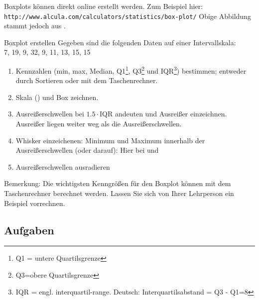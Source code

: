 
Boxplots können direkt online erstellt werden. Zum Beispiel hier:\\
\texttt{http://www.alcula.com/calculators/statistics/box-plot/}
Obige Abbildung stammt jedoch aus \cite{frommenwiler17alg}.

\begin{beispiel}{Boxplot erstellen}{}
  Gegeben sind die folgenden Daten auf einer Intervallskala:\\
  7, 19, 9, 32, 9, 11, 13, 15, 15
\end{beispiel}

\begin{rezept}{}{}
  \begin{enumerate}
  \item Kennzahlen (min, max, Median, Q1\footnote{Q1 = untere Quartilsgrenze}, Q3\footnote{Q3=obere Quartilsgrenze} und IQR\footnote{IQR = engl. interquartil-range. Deutsch: Interquartilsabstand = Q3 - Q1=8}) bestimmen; entweder durch Sortieren oder mit dem Taschenrechner.
  \item Skala () und Box zeichnen.
  \item
    Ausreißerschwellen bei $1.5\cdot$IQR andeuten und Ausreißer einzeichnen. Ausreißer liegen weiter weg als die Ausreißerschwellen.
  \item Whisker einzeichenen: Minimum und Maximum innerhalb der Ausreißerschwellen (oder darauf): Hier bei  und 
  \item Ausreißerschwellen ausradieren
    \end{enumerate}
\end{rezept}

Bemerkung: Die wichtigsten Kenngrößen für den Boxplot können mit dem Taschenrechner berechnet werden. Lassen Sie sich von Ihrer Lehrperson ein Beispiel vorrechnen.

\newpage

\subsection*{Aufgaben}


